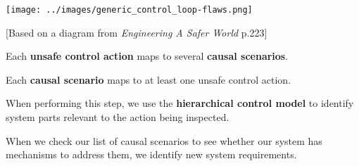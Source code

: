 \documentclass[letterpaper]{tufte-book}
\begin{document}
\begin{center}
\texttt{[image: ../images/generic\_control\_loop-flaws.png]}
\end{center}

[Based on a diagram from \emph{Engineering A Safer World} p.223]


Each \textbf{unsafe control action} maps to several \textbf{causal scenarios}.

Each \textbf{causal scenario} maps to at least one unsafe control action.

When performing this step, we use the \textbf{hierarchical control model} to identify system parts relevant to the action being inspected.

When we check our list of causal scenarios to see whether our system has mechanisms to address them, we identify new system requirements.

\pagebreak

 

\end{document}
